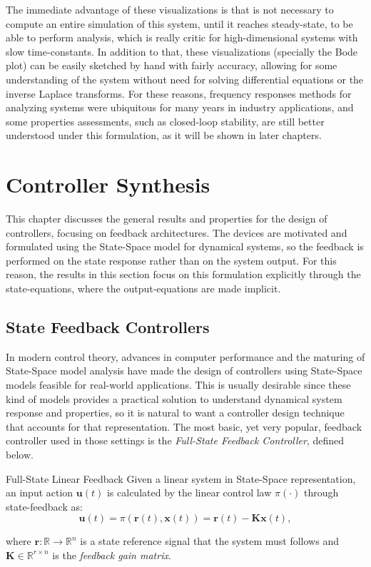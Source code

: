 \documentclass[a4paper,11pt]{book}
\numberwithin{figure}{chapter}
\numberwithin{equation}{chapter}
\numberwithin{table}{chapter}
\theoremstyle{definition}
\newtheorem{definition}{Definition}[chapter]
\newcounter{boxed-theorem}
\newcounter{boxed-definition}
\newenvironment{boxed-definition}[1]
{\colorlet{shadecolor}{pastelYellow!15} \begin{shaded} \begin{definition}{#1}}
{\end{definition} \end{shaded}}
\newcounter{boxed-example}
\begin{document}
The immediate advantage of these visualizations is that is not necessary to compute an entire simulation of this system, until it reaches steady-state, to be able to perform analysis, which is really critic for high-dimensional systems with slow time-constants. In addition to that, these visualizations (specially the Bode plot) can be easily sketched by hand with fairly accuracy, allowing for some understanding of the system without need for solving differential equations or the inverse Laplace transforms. For these reasons, frequency responses methods for analyzing systems were ubiquitous for many years in industry applications, and some properties assessments, such as closed-loop stability, are still better understood under this formulation, as it will be shown in later chapters.

\clearpage
\chapter{Controller Synthesis}

This chapter discusses the general results and properties for the design of controllers, focusing on feedback architectures. The devices are motivated and formulated using the State-Space model for dynamical systems, so the feedback is performed on the state response rather than on the system output. For this reason, the results in this section focus on this formulation explicitly through the state-equations, where the output-equations are made implicit.

\section{State Feedback Controllers}

In modern control theory, advances in computer performance and the maturing of State-Space model analysis have made the design of controllers using State-Space models feasible for real-world applications. This is usually desirable since these kind of models provides a practical solution to understand dynamical system response and properties, so it is natural to want a controller design technique that accounts for that representation. The most basic, yet very popular, feedback controller used in those settings is the \textit{Full-State Feedback Controller}, defined below. 

\begin{boxed-definition}{Full-State Linear Feedback}
    Given a linear system in State-Space representation, an input action $\bm{u}(t)$ is calculated by the linear control law $\pi(\cdot)$ through state-feedback as:
    \begin{equation}
        \bm{u}(t) = \pi(\bm{r}(t), \bm{x}(t)) = \bm{r}(t) - \bm{K} \bm{x}(t)
    ,\end{equation}
    
    \noindent where $\bm{r} : \mathbb{R} \rightarrow \mathbb{R}^{n}$ is a state reference signal that the system must follows and $\bm{K} \in \mathbb{R}^{r \times n}$ is the \textit{feedback gain matrix}.
\end{boxed-definition}
\end{document}
